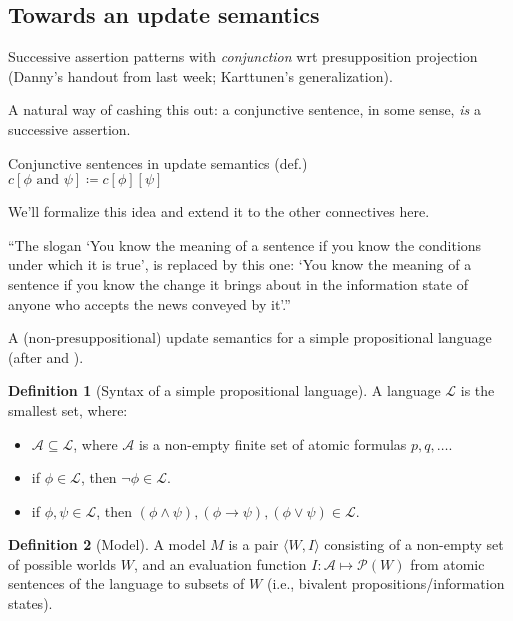 \documentclass[nols,twoside,nofonts,nobib,nohyper]{tufte-handout}
\theoremstyle{definition}
\newtheorem{definition}{Definition}[section]
\begin{document}
\subsection{Towards an update semantics}

Successive assertion patterns with \textit{conjunction} wrt presupposition projection (Danny's handout from last week; Karttunen's generalization).

A natural way of cashing this out: a conjunctive sentence, in some sense, \textit{is} a successive assertion.

\ex Conjunctive sentences in update semantics (def.)\\
$c[ϕ\text{ and }ψ] ≔ c[ϕ][ψ]$
\xe

We'll formalize this idea and extend it to the other connectives here.

\begin{displayquote}
\enquote{The slogan `You know the meaning of a sentence if you know the conditions under which it is true', is replaced by this one: `You know the meaning of a sentence if you know the change it brings about in the information state of anyone who accepts the news conveyed by it'.}
\end{displayquote}

A (non-presuppositional) update semantics for a simple propositional language (after \citealt{Veltman1996} and \citealt{Heim1983}).

\begin{definition}[Syntax of a simple propositional language]
  A language $\mathscr{L}$ is the smallest set, where:
  \begin{itemize}
      \item $\mathscr{A} ⊆ \mathscr{L}$, where $\mathscr{A}$ is a non-empty finite set of atomic formulas $p,q,…$.
      \item if $ϕ ∈ \mathscr{L}$, then $¬ ϕ ∈ \mathscr{L}$.
      \item if $ϕ,ψ ∈ \mathscr{L}$, then $(ϕ ∧ ψ), (ϕ → ψ), (ϕ ∨ ψ) ∈ \mathscr{L}$.
  \end{itemize}
\end{definition}


\begin{definition}[Model]
A model $M$ is a pair $⟨W,I⟩$ consisting of a non-empty set of possible worlds $W$, and an evaluation function $I:\mathscr{A} ↦ \mathscr{P}(W)$ from atomic sentences of the language to subsets of $W$ (i.e., bivalent propositions/information states).
\end{definition}
\end{document}
